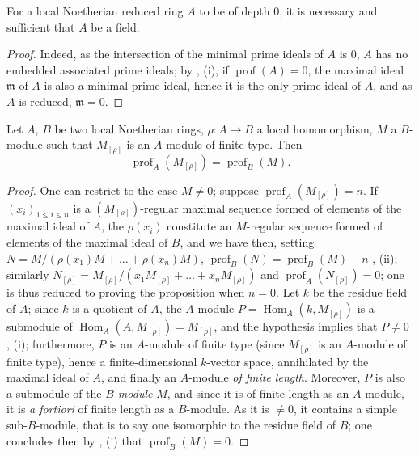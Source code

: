 \begin{corollary}[16.4.7]
\label{0.16.4.7}
For a local Noetherian reduced ring $A$ to be of depth $0$, it is necessary and sufficient that $A$ be a field.
\end{corollary}

\begin{proof}
Indeed, as the intersection of the minimal prime ideals of $A$ is $0$, $A$ has no embedded associated prime ideals; by , (i), if $\operatorname{prof}(A)=0$, the maximal ideal $\mathfrak{m}$ of $A$ is also a minimal prime ideal, hence it is the only prime ideal of $A$, and as $A$ is reduced, $\mathfrak{m}=0$.
\end{proof}

\begin{proposition}[16.4.8]
\label{0.16.4.8}
Let $A$, $B$ be two local Noetherian rings, $\rho:A\to B$ a local homomorphism, $M$ a $B$-module such that $M_{[\rho]}$ is an $A$-module of finite type.
Then
\begin{equation}
\label{0.16.4.8.1}
\tag{16.4.8.1}
  \operatorname{prof}_A(M_{[\rho]})=\operatorname{prof}_B(M).
\end{equation}
\end{proposition}

\begin{proof}
One can restrict to the case $M\neq 0$; suppose $\operatorname{prof}_A(M_{[\rho]})=n$.
If $(x_i)_{1\leq i\leq n}$ is a $(M_{[\rho]})$-regular maximal sequence formed of elements of the maximal ideal of $A$, the $\rho(x_i)$ constitute an $M$-regular sequence formed of elements of the maximal ideal of $B$, and we have then, setting $N=M/(\rho(x_1)M+\ldots+\rho(x_n)M)$, $\operatorname{prof}_B(N)=\operatorname{prof}_B(M)-n$ , (ii); similarly $N_{[\rho]}=M_{[\rho]}/(x_1M_{[\rho]}+\ldots+x_n M_{[\rho]})$ and $\operatorname{prof}_A(N_{[\rho]})=0$; one is thus reduced to proving the proposition when $n=0$.
Let $k$ be the residue field of $A$; since $k$ is a quotient of $A$, the $A$-module $P=\operatorname{Hom}_A(k,M_{[\rho]})$ is a submodule of $\operatorname{Hom}_A(A,M_{[\rho]})=M_{[\rho]}$, and the hypothesis implies that $P\neq 0$ , (i); furthermore, $P$ is an $A$-module of finite type (since $M_{[\rho]}$ is an $A$-module of finite type), hence a finite-dimensional $k$-vector space, annihilated by the maximal ideal of $A$, and finally an $A$-module \emph{of finite length}.
Moreover, $P$ is also a submodule of the \emph{$B$-module} $M$, and since it is of finite length as an $A$-module, it is \emph{a fortiori} of finite length as a $B$-module.
As it is $\neq 0$, it contains a simple sub-$B$-module, that is to say one isomorphic to the residue field of $B$; one concludes then by , (i) that $\operatorname{prof}_B(M)=0$.
\end{proof}

